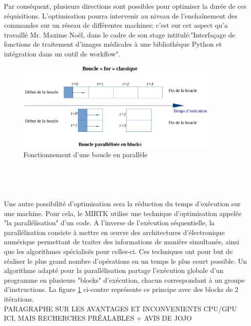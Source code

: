 \documentclass[10pt]{report}
\begin{document}
	Par conséquent, plusieurs directions sont possibles pour optimiser la durée de ces réquisitions. L'optimisation pourra intervenir au niveau de l'enchaînement des commandes sur un réseau de différentes machines: c'est sur cet aspect qu'a travaillé Mr. Maxime Noël, dans le cadre de son stage intitulé:"Interfaçage de fonctions de traitement d'images médicales à une bibliothèque Python et intégration dans un outil de workflow".\\
	\vspace{-0.7cm}
	\begin{figure}
		\includegraphics[width=10cm]{Reports/figures/gfor.eps}	
		\caption{Fonctionnement d'une boucle en parallèle}
		\label{Fonctionnement d'une boucle en parallèle}
	\end{figure}
	
	~\par~\par
	Une autre possibilité d'optimisation sera la réduction du temps d'exécution sur une machine. Pour cela, le MIRTK utilise une technique d'optimisation appelée "la parallélisation" d'un code. 
	A l'inverse de l'exécution séquentielle, la parallélisation consiste à mettre en œuvre des architectures d'électronique numérique permettant de traiter des informations de manière simultanée, ainsi que les algorithmes spécialisés pour celles-ci. Ces techniques ont pour but de réaliser le plus grand nombre d'opérations en un temps le plus court possible.
	Un algorithme adapté pour la parallélisation partage l'exécution globale d'un programme en plusieurs "blocks" d'exécution, chacun correspondant à un groupe d'instructions. La figure \ref{Fonctionnement d'une boucle en parallèle} ci-contre représente ce principe avec des blocks de 2 itérations.\\


	PARAGRAPHE SUR LES AVANTAGES ET INCONVENIENTS CPU/GPU ICI, MAIS RECHERCHES PRÉALABLES + AVIS DE JOJO
	\\
	
\end{document}
